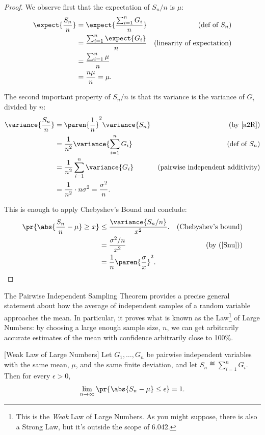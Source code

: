 \begin{proof}
We observe first that the expectation of $S_n/n$ is $\mu$:
\begin{align*}
\expect{\frac{S_n}{n}} & = \expect{\frac{\sum_{i=1}^n G_i}{n}}
         & \text{(def of $S_n$)}\\
 & = \frac{\sum_{i=1}^n \expect{G_i}}{n} 
     & \text{(linearity of expectation)}\\
 & = \frac{\sum_{i=1}^n \mu}{n}\\
 & = \frac{n\mu}{n} = \mu.
\end{align*}

The second important property of $S_n/n$ is that its variance is the
variance of $G_i$ divided by $n$:
\begin{align}
\variance{\frac{S_n}{n}} & =  \paren{\frac{1}{n}}^2 \variance{S_n}
          & \mbox{(by~\eqref{a2R})}\notag\\
 & =  \frac{1}{n^2} \variance{\sum_{i=1}^n G_i} 
          & \text{(def of $S_n$)}\notag\\
 & =  \frac{1}{n^2} \sum_{i=1}^n \variance{G_i}
        & \text{(pairwise independent additivity)}\notag\\
 & =  \frac{1}{n^2}\cdot n\sigma^2 =  \frac{\sigma^2}{n}.\label{Snu}
\end{align}

This is enough to apply Chebyshev's Bound and conclude:
\begin{align*}
\pr{\abs{\frac{S_n}{n} - \mu} \geq x} & \leq \frac{\variance{S_n/n}}{x^2}.
       & \text{(Chebyshev's bound)}\\
    & = \frac{\sigma^2/n}{x^2} & \text{(by~(\ref{Snu}))}\\
    & = \frac{1}{n} \paren{\frac{\sigma}{x}}^2.
\end{align*}

\end{proof}

The Pairwise Independent Sampling Theorem provides a precise general
statement about how the average of independent samples of a random
variable approaches the mean.  In particular, it proves what is known as
the Law\footnote{This is the \emph{Weak} Law of Large Numbers.  As you
might suppose, there is also a Strong Law, but it's outside the scope of
6.042.} of Large Numbers: by choosing a large enough sample size, $n$, we
can get arbitrarily accurate estimates of the mean with confidence
arbitrarily close to 100\%.

\begin{corollary}\label{weaklaw}[Weak Law of Large Numbers]
  Let $G_1, \dots, G_n$ be pairwise independent variables with the same
  mean, $\mu$, and the same finite deviation, and let $S_n \eqdef
  \sum_{i=1}^n G_i$.  Then for every $\epsilon > 0$,
\[
\lim_{n \rightarrow \infty}
        \pr{\abs{S_n - \mu}  \leq \epsilon} = 1.
\]
\end{corollary}


